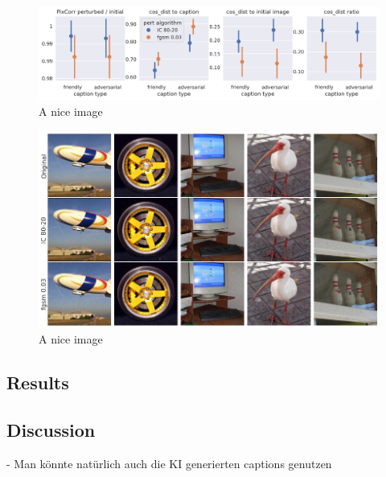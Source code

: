 \begin{figure}[ht]
    \centering
    \includegraphics[width=1\textwidth]{plots/advpert_validation_chosen_perts.png}
    \caption{A nice image}\label{fig:advpert_validation_chosen_perts}
\end{figure}


\begin{figure}[ht]
    \centering
    \includegraphics[width=1\textwidth]{plots/advpert_validation_chosen_qual.png}
    \caption{A nice image}\label{fig:advpert_validation_chosen_qual}
\end{figure}


\subsection{Results}

\subsection{Discussion}

- Man könnte natürlich auch die KI generierten captions genutzen